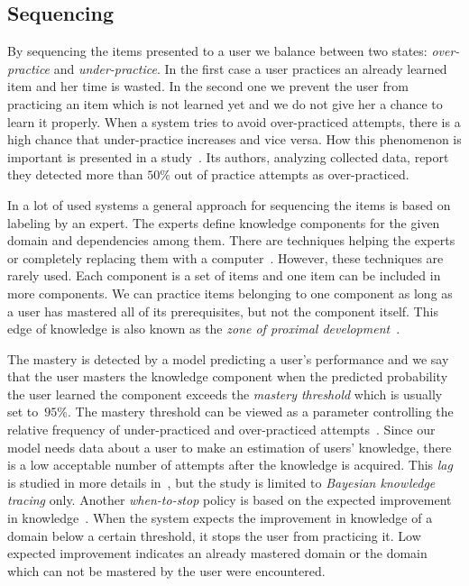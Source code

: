 \documentclass[table,color,cover,twoside,nolot,nolof]{fithesis3/fithesis3}
\begin{document}
\subsection{Sequencing}

By sequencing the items presented to a user we balance between two states:
\emph{over-practice} and \emph{under-practice}. In the first case a user practices
an already learned item and her time is wasted. In the second one we prevent the user from
practicing an item which is not learned yet and we do not give her a chance
to learn it properly. When a system tries to avoid over-practiced attempts,
there is a high chance that under-practice increases and vice versa. How this
phenomenon is important is presented in a study~\cite{cen2007over}. Its
authors, analyzing collected data, report they detected more than $50\%$ out of
practice attempts as over-practiced.

In a lot of used systems a general approach for sequencing the items is based
on labeling by an expert. The experts define knowledge components for the
given domain and dependencies among them. There are
techniques helping the ex\-perts~\cite{niznan2014using} or completely replacing
them with a computer~\cite{boros2013automatic}. However, these techniques are
rarely used. Each component is a set of items and one item can be
included in more components. We can practice items belonging to one component
as long as a user has mastered all of its prerequisites, but not the component
itself. This edge of knowledge is also known as the \emph{zone of proximal
development}~\cite{lee2005signifying}.

The mastery is detected by a model predicting a user's performance and we say
that the user masters the knowledge component when the predicted probability
the user learned the component exceeds the \emph{mastery threshold} which is
usually set to~$95\%$. The mastery threshold can be viewed as a parameter
controlling the relative frequency of under-practiced and over-practiced
attempts~\cite{fancsali2013optimal}. Since our model needs data about a user to
make an estimation of users' knowledge, there is a low acceptable number of
attempts after the knowledge is acquired. This \emph{lag} is studied in more
details in~\cite{fancsali2013optimal}, but the study is limited to
\emph{Bayesian knowledge tracing} only. Another \emph{when-to-stop} policy is
based on the expected improvement in knowledge~\cite{rollinson2015predictive}.
When the system expects the improvement in knowledge of a domain
below a certain threshold, it stops the user from practicing it. Low expected
improvement indicates an already mastered domain or the domain which can not be
mastered by the user were encountered.
\end{document}
